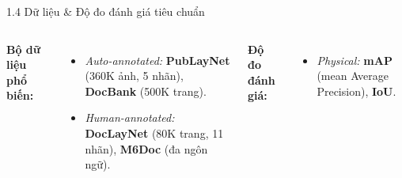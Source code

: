 \documentclass[aspectratio=1610,8pt]{beamer}
\begin{document}
\begin{frame}{1.4 \; Dữ liệu \& Độ đo đánh giá tiêu chuẩn}
    \begin{columns}[T]
        \textbf{Bộ dữ liệu phổ biến:}
        \begin{itemize}
            \item \textit{Auto-annotated:} \textbf{PubLayNet} \cite{zhong2019publaynet} (360K ảnh, 5 nhãn), \textbf{DocBank} \cite{li2020docbank} (500K trang).
            \item \textit{Human-annotated:} \textbf{DocLayNet} \cite{dla_benchmark_2022_sigkdd_2022_doclaynet_a_large_human_annotated_dataset_for_documen} (80K trang, 11 nhãn), \textbf{M6Doc} \cite{dla_benchmark_2023_cvpr_2023_m6doc_a_large_scale_multi_format_multi_type_multi_layou} (đa ngôn ngữ).
        \end{itemize}

        \textbf{Độ đo đánh giá:}
        \begin{itemize}
            \item \textit{Physical:} \textbf{mAP} (mean Average Precision), \textbf{IoU}.
        \end{itemize}
    \end{columns}
\end{frame}
\end{document}
